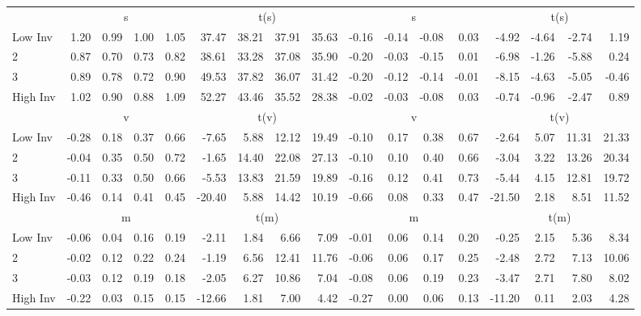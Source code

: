 \begin{table}[!ht]
\begin{tabular}{lrrrrrrrrrrrrrrrr}
  
     & \multicolumn{4}{c}{s} & \multicolumn{4}{c}{t(s)}  & \multicolumn{4}{c}{s} & \multicolumn{4}{c}{t(s)}   \\
     \cmidrule(r){2-5} \cmidrule(r){6-9}  \cmidrule(r){10-13} \cmidrule(r){14-17} 
    Low Inv  & 1.20  & 0.99  & 1.00  & 1.05  & 37.47  & 38.21  & 37.91  & 35.63  & -0.16  & -0.14  & -0.08  & 0.03  & -4.92  & -4.64  & -2.74  & 1.19   \\
    2  & 0.87  & 0.70  & 0.73  & 0.82  & 38.61  & 33.28  & 37.08  & 35.90  & -0.20  & -0.03  & -0.15  & 0.01  & -6.98  & -1.26  & -5.88  & 0.24   \\
    3  & 0.89  & 0.78  & 0.72  & 0.90  & 49.53  & 37.82  & 36.07  & 31.42  & -0.20  & -0.12  & -0.14  & -0.01  & -8.15  & -4.63  & -5.05  & -0.46   \\
    High Inv  & 1.02  & 0.90  & 0.88  & 1.09  & 52.27  & 43.46  & 35.52  & 28.38  & -0.02  & -0.03  & -0.08  & 0.03  & -0.74  & -0.96  & -2.47  & 0.89   \\
    
  
     & \multicolumn{4}{c}{v} & \multicolumn{4}{c}{t(v)}  & \multicolumn{4}{c}{v} & \multicolumn{4}{c}{t(v)}   \\
     \cmidrule(r){2-5} \cmidrule(r){6-9}  \cmidrule(r){10-13} \cmidrule(r){14-17} 
    Low Inv  & -0.28  & 0.18  & 0.37  & 0.66  & -7.65  & 5.88  & 12.12  & 19.49  & -0.10  & 0.17  & 0.38  & 0.67  & -2.64  & 5.07  & 11.31  & 21.33   \\
    2  & -0.04  & 0.35  & 0.50  & 0.72  & -1.65  & 14.40  & 22.08  & 27.13  & -0.10  & 0.10  & 0.40  & 0.66  & -3.04  & 3.22  & 13.26  & 20.34   \\
    3  & -0.11  & 0.33  & 0.50  & 0.66  & -5.53  & 13.83  & 21.59  & 19.89  & -0.16  & 0.12  & 0.41  & 0.73  & -5.44  & 4.15  & 12.81  & 19.72   \\
    High Inv  & -0.46  & 0.14  & 0.41  & 0.45  & -20.40  & 5.88  & 14.42  & 10.19  & -0.66  & 0.08  & 0.33  & 0.47  & -21.50  & 2.18  & 8.51  & 11.52   \\
    
  
     & \multicolumn{4}{c}{m} & \multicolumn{4}{c}{t(m)}  & \multicolumn{4}{c}{m} & \multicolumn{4}{c}{t(m)}   \\
     \cmidrule(r){2-5} \cmidrule(r){6-9}  \cmidrule(r){10-13} \cmidrule(r){14-17} 
    Low Inv  & -0.06  & 0.04  & 0.16  & 0.19  & -2.11  & 1.84  & 6.66  & 7.09  & -0.01  & 0.06  & 0.14  & 0.20  & -0.25  & 2.15  & 5.36  & 8.34   \\
    2  & -0.02  & 0.12  & 0.22  & 0.24  & -1.19  & 6.56  & 12.41  & 11.76  & -0.06  & 0.06  & 0.17  & 0.25  & -2.48  & 2.72  & 7.13  & 10.06   \\
    3  & -0.03  & 0.12  & 0.19  & 0.18  & -2.05  & 6.27  & 10.86  & 7.04  & -0.08  & 0.06  & 0.19  & 0.23  & -3.47  & 2.71  & 7.80  & 8.02   \\
    High Inv  & -0.22  & 0.03  & 0.15  & 0.15  & -12.66  & 1.81  & 7.00  & 4.42  & -0.27  & 0.00  & 0.06  & 0.13  & -11.20  & 0.11  & 2.03  & 4.28   \\
    

\end{tabular}
\end{table}
